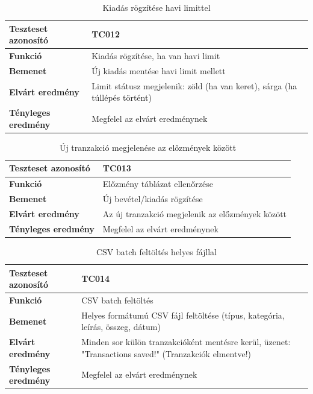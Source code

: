\begin{table}[h!]
	\centering
	\begin{tabular}{|l|p{10cm}|}
		\hline
		\textbf{Teszteset azonosító} & TC012 \\ \hline
		\textbf{Funkció} & Kiadás rögzítése, ha van havi limit \\ \hline
		\textbf{Bemenet} & Új kiadás mentése havi limit mellett \\ \hline
		\textbf{Elvárt eredmény} & Limit státusz megjelenik: zöld (ha van keret), sárga (ha túllépés történt) \\ \hline
		\textbf{Tényleges eredmény} & Megfelel az elvárt eredménynek \\ \hline
	\end{tabular}
	\caption{Kiadás rögzítése havi limittel}
	\label{tab:kiadas_limit_ellenorzes}
\end{table}

\begin{table}[h!]
	\centering
	\begin{tabular}{|l|p{10cm}|}
		\hline
		\textbf{Teszteset azonosító} & TC013 \\ \hline
		\textbf{Funkció} & Előzmény táblázat ellenőrzése \\ \hline
		\textbf{Bemenet} & Új bevétel/kiadás rögzítése \\ \hline
		\textbf{Elvárt eredmény} & Az új tranzakció megjelenik az előzmények között \\ \hline
		\textbf{Tényleges eredmény} & Megfelel az elvárt eredménynek \\ \hline
	\end{tabular}
	\caption{Új tranzakció megjelenése az előzmények között}
	\label{tab:elozmeny_tabla}
\end{table}

\begin{table}[h!]
	\centering
	\begin{tabular}{|l|p{10cm}|}
		\hline
		\textbf{Teszteset azonosító} & TC014 \\ \hline
		\textbf{Funkció} & CSV batch feltöltés \\ \hline
		\textbf{Bemenet} & Helyes formátumú CSV fájl feltöltése (típus, kategória, leírás, összeg, dátum) \\ \hline
		\textbf{Elvárt eredmény} & Minden sor külön tranzakcióként mentésre kerül, üzenet: "Transactions saved!" (Tranzakciók elmentve!) \\ \hline
		\textbf{Tényleges eredmény} & Megfelel az elvárt eredménynek \\ \hline
	\end{tabular}
	\caption{CSV batch feltöltés helyes fájllal}
	\label{tab:csv_feltoltes}
\end{table}

